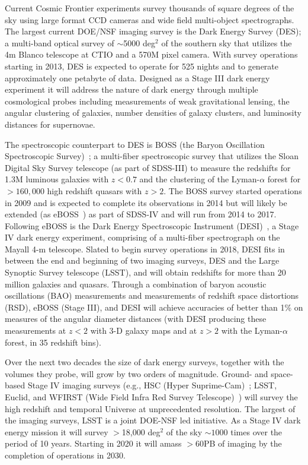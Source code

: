 Current Cosmic Frontier experiments survey thousands of square degrees
of the sky using large format CCD cameras and wide field multi-object
spectrographs. The largest current DOE/NSF imaging survey is the Dark
Energy Survey (DES); a multi-band optical survey of
$\sim$5000 deg$^{2}$ of the southern sky that utilizes the 4m Blanco
telescope at CTIO and a 570M pixel camera. With survey operations
starting in 2013, DES is expected to operate for 525 nights and to
generate approximately one petabyte of data. Designed as a Stage III
dark energy experiment it will address the nature of dark energy
through multiple cosmological probes including measurements of weak
gravitational lensing, the angular clustering of galaxies, number
densities of galaxy clusters, and luminosity distances for
supernovae. 

The spectroscopic counterpart to DES is BOSS (the Baryon Oscillation
Spectroscopic Survey)~\cite{boss}; a multi-fiber spectroscopic survey
that utilizes the Sloan Digital Sky Survey telescope (as part of
SDSS-III) to measure the redshifts for 1.3M luminous galaxies with
$z<0.7$ and the clustering of the Lyman-$\alpha$ forest for $>160,000$
high redshift quasars with $z>2$. The BOSS survey started operations
in 2009 and is expected to complete its observations in 2014 but will
likely be extended (as eBOSS~\cite{eboss}) as part of SDSS-IV and will
run from 2014 to 2017. Following eBOSS is the Dark Energy
Spectroscopic Instrument (DESI)~\cite{desi}, a Stage IV dark energy
experiment, comprising of a multi-fiber spectrograph on the Mayall 4-m
telescope. Slated to begin survey operations in 2018, DESI fits in
between the end and beginning of two imaging surveys, DES and the
Large Synoptic Survey telescope (LSST), and will obtain redshifts for
more than 20 million galaxies and quasars. Through a combination of
baryon acoustic oscillations (BAO) measurements and measurements of
redshift space distortions (RSD), eBOSS (Stage III), and DESI will
achieve accuracies of better than 1\% on measures of the angular
diameter distances (with DESI producing these measurements at $z<2$ with
3-D galaxy maps and at $z>2$ with the Lyman-$\alpha$ forest, in 35
redshift bins).

Over the next two decades the size of dark energy surveys, together
with the volumes they probe, will grow by two orders of magnitude.
Ground- and space- based Stage IV imaging surveys (e.g., HSC (Hyper
Suprime-Cam)~\cite{hsc}; LSST\cite{lsst}, Euclid\cite{euclid}, and
WFIRST (Wide Field Infra Red Survey Telescope)~\cite{wfirst}) will
survey the high redshift and temporal Universe at unprecedented
resolution.  The largest of the imaging surveys, LSST is a joint
DOE-NSF led initiative. As a Stage IV dark energy mission it will
survey $>$18,000 deg$^{2}$ of the sky $\sim 1000$ times over the
period of 10 years. Starting in 2020 it will amass $>60$PB of imaging
by the completion of operations in 2030.

